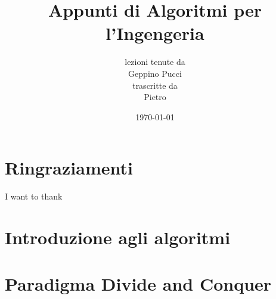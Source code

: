 \documentclass[a4paper,oneside]{book}
\title{Appunti di Algoritmi per l'Ingengeria}
\author{lezioni tenute da\\ Geppino Pucci \\ trascritte da \\ Pietro}
\date{\today}
\theoremstyle{definition}
\theoremstyle{theorem}
\begin{document}
\pagestyle{plain}

% 
\maketitle

\cleardoublepage

\frontmatter %

\chapter*{Ringraziamenti}
I want to thank \lipsum[5-6]


\tableofcontents

\mainmatter

\pagestyle{fancy}


\chapter{Introduzione agli algoritmi}


\chapter{Paradigma Divide and Conquer}

\end{document}
